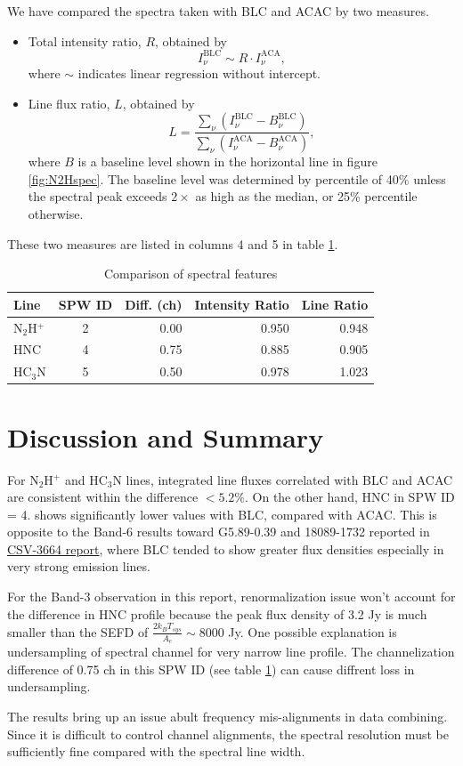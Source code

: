 \documentclass[a4paper, 10pt]{scrartcl}
\begin{document}
We have compared the spectra taken with BLC and ACAC by two measures.

\begin{itemize}
\item Total intensity ratio, $R$, obtained by \[ I^\mathrm{BLC}_{\nu} \sim R \cdot I^\mathrm{ACA}_{\nu}, \] where $\sim$ indicates linear regression without intercept.

\item Line flux ratio, $L$, obtained by \[ L = \frac{\sum_{\nu} (I^\mathrm{BLC}_{\nu} - B^\mathrm{BLC}_{\nu})}{\sum_{\nu} (I^\mathrm{ACA}_{\nu} - B^\mathrm{ACA}_{\nu}) }, \] where $B$ is a baseline level shown in the horizontal line in figure \ref{fig:N2Hspec}. The baseline level was determined by percentile of 40\% unless the spectral peak exceeds $2\times$ as high as the median, or 25\% percentile otherwise.
\end{itemize}

These two measures are listed in columns 4 and 5 in table \ref{tab:Spectra}.

\begin{table}[h]
\centering
\caption{Comparison of spectral features}
\label{tab:Spectra}
\begin{tabular}{lcrrr} \hline \hline
Line        & SPW ID & Diff. (ch)  & Intensity Ratio & Line Ratio \\ \hline 
N$_2$H$^+$  & 2      & 0.00        & 0.950           & 0.948 \\
HNC         & 4      & 0.75        & 0.885           & 0.905 \\
HC$_3$N     & 5      & 0.50        & 0.978           & 1.023 \\ \hline
\end{tabular}
\end{table}

\section{Discussion and Summary}
For N$_2$H$^+$ and HC$_3$N lines, integrated line fluxes correlated with BLC and ACAC are consistent within the difference $< 5.2$\%. On the other hand, HNC in SPW ID = 4. shows significantly lower values with BLC, compared with ACAC. This is opposite to the Band-6 results toward G5.89-0.39 and 18089-1732 reported in \href{http://www.alma.cl/~skameno/Documents/CSV-3664/}{CSV-3664 report}, where BLC tended to show greater flux densities especially in very strong emission lines.

For the Band-3 observation in this report, renormalization issue won't account for the difference in HNC profile because the peak flux density of 3.2 Jy is much smaller than the SEFD of $\frac{2 k_B T_{sys}}{A_{e}} \sim 8000$ Jy.
One possible explanation is undersampling of spectral channel for very narrow line profile. The channelization difference of 0.75 ch in this SPW ID (see table \ref{tab:Spectra}) can cause diffrent loss in undersampling.

The results bring up an issue abult frequency mis-alignments in data combining. Since it is difficult to control channel alignments, the spectral resolution must be sufficiently fine compared with the spectral line width.
\end{document}
